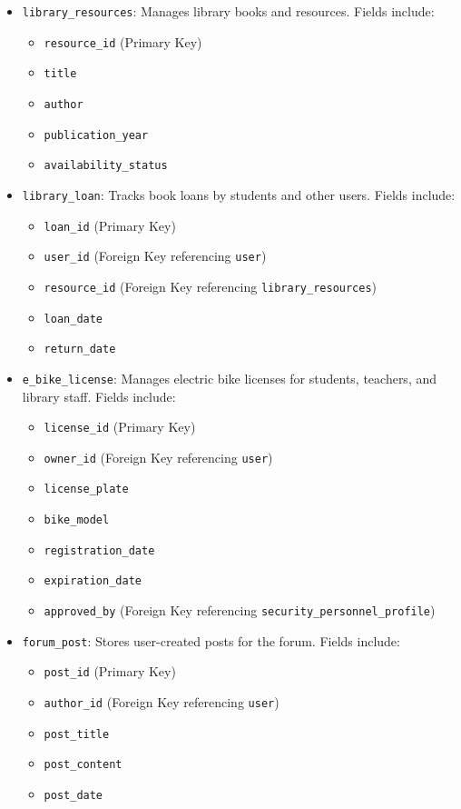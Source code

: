 \documentclass[12pt]{article}
\begin{document}
\begin{itemize}
    \item \texttt{library\_resources}: Manages library books and resources. Fields include:
    \begin{itemize}
        \item \texttt{resource\_id} (Primary Key)
        \item \texttt{title}
        \item \texttt{author}
        \item \texttt{publication\_year}
        \item \texttt{availability\_status}
    \end{itemize}

    \item \texttt{library\_loan}: Tracks book loans by students and other users. Fields include:
    \begin{itemize}
        \item \texttt{loan\_id} (Primary Key)
        \item \texttt{user\_id} (Foreign Key referencing \texttt{user})
        \item \texttt{resource\_id} (Foreign Key referencing \texttt{library\_resources})
        \item \texttt{loan\_date}
        \item \texttt{return\_date}
    \end{itemize}

    \item \texttt{e\_bike\_license}: Manages electric bike licenses for students, teachers, and library staff. Fields include:
    \begin{itemize}
        \item \texttt{license\_id} (Primary Key)
        \item \texttt{owner\_id} (Foreign Key referencing \texttt{user})
        \item \texttt{license\_plate}
        \item \texttt{bike\_model}
        \item \texttt{registration\_date}
        \item \texttt{expiration\_date}
        \item \texttt{approved\_by} (Foreign Key referencing \texttt{security\_personnel\_profile})
    \end{itemize}

    \item \texttt{forum\_post}: Stores user-created posts for the forum. Fields include:
    \begin{itemize}
        \item \texttt{post\_id} (Primary Key)
        \item \texttt{author\_id} (Foreign Key referencing \texttt{user})
        \item \texttt{post\_title}
        \item \texttt{post\_content}
        \item \texttt{post\_date}
    \end{itemize}


\end{itemize}
\end{document}
